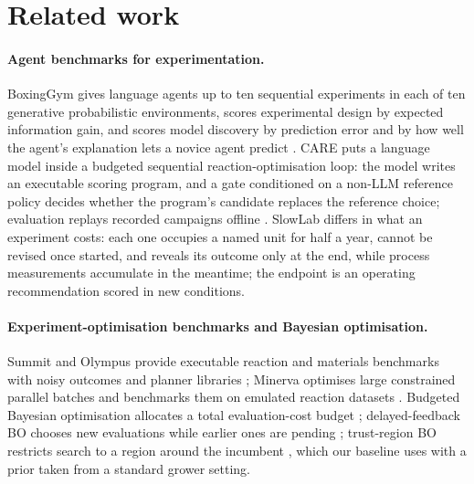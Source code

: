 \section{Related work}
\label{sec:related}
\paragraph{Agent benchmarks for experimentation.} BoxingGym gives language agents up to ten sequential experiments in each of ten generative probabilistic environments, scores experimental design by expected information gain, and scores model discovery by prediction error and by how well the agent's explanation lets a novice agent predict \citep{boxinggym}. CARE puts a language model inside a budgeted sequential reaction-optimisation loop: the model writes an executable scoring program, and a gate conditioned on a non-LLM reference policy decides whether the program's candidate replaces the reference choice; evaluation replays recorded campaigns offline \citep{care2026}. SlowLab differs in what an experiment costs: each one occupies a named unit for half a year, cannot be revised once started, and reveals its outcome only at the end, while process measurements accumulate in the meantime; the endpoint is an operating recommendation scored in new conditions.

\paragraph{Experiment-optimisation benchmarks and Bayesian optimisation.} Summit and Olympus provide executable reaction and materials benchmarks with noisy outcomes and planner libraries \citep{summit,olympus}; Minerva optimises large constrained parallel batches and benchmarks them on emulated reaction datasets \citep{minerva}. Budgeted Bayesian optimisation allocates a total evaluation-cost budget \citep{astudillo2021budgeted}; delayed-feedback BO chooses new evaluations while earlier ones are pending \citep{verma2022delayed}; trust-region BO restricts search to a region around the incumbent \citep{eriksson2019turbo}, which our baseline uses with a prior taken from a standard grower setting.

